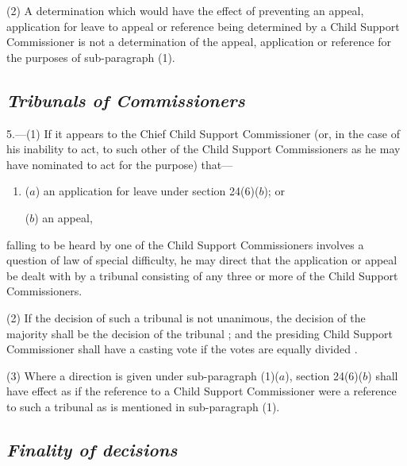 \documentclass[12pt,a4paper]{article}
\begin{document}
(2) A determination which would have the effect of preventing an appeal, application for leave to appeal or reference being determined by a Child Support Commissioner is not a determination of the appeal, application or reference for the purposes of sub-paragraph (1).


\subsection*{\itshape Tribunals of Commissioners}

5.---(1) If it appears to the Chief Child Support Commissioner (or, in the case of his inability to act, to such other of the Child Support Commissioners as he may have nominated to act for the purpose) 
that—
\begin{enumerate}\item[]
($a$) an application for leave under section 24(6)($b$); or

($b$) an appeal,
\end{enumerate}  %
falling to be heard by one of the Child Support Commissioners involves a question of law of special difficulty, he may direct 
that the application or appeal  %
be dealt with by a tribunal consisting of any three 
or more  %
of the Child Support Commissioners.

(2) If the decision of such a tribunal is not unanimous, the decision of the majority shall be the decision of the tribunal%
; and the presiding Child Support Commissioner shall have a casting vote if the votes are equally divided  %
.

(3) Where a direction is given under sub-paragraph (1)($a$), section 24(6)($b$) shall have effect as if the reference to a Child Support Commissioner were a reference to such a tribunal as is mentioned in sub-paragraph (1).


\subsection*{\itshape Finality of decisions}
\end{document}
